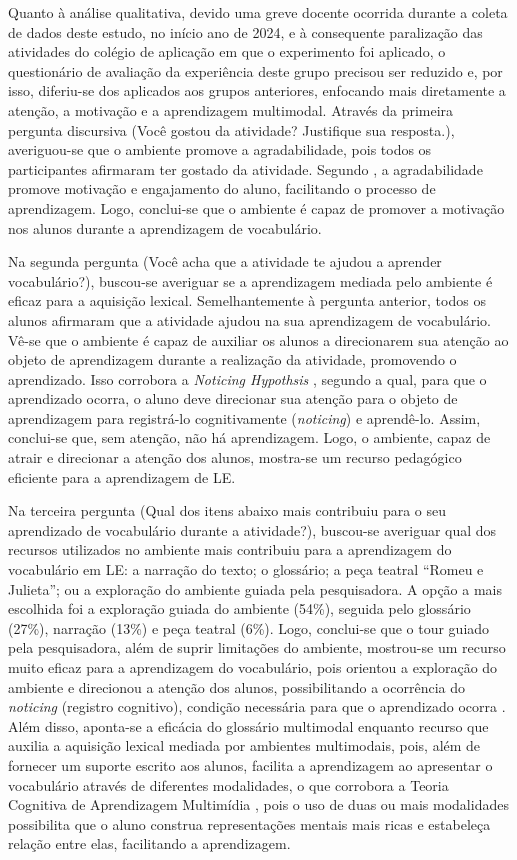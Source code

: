 Quanto à análise qualitativa, devido uma greve docente ocorrida durante
a coleta de dados deste estudo, no início ano de 2024, e à consequente
paralização das atividades do colégio de aplicação em que o experimento
foi aplicado, o questionário de avaliação da experiência deste grupo
precisou ser reduzido e, por isso, diferiu-se dos aplicados aos grupos
anteriores, enfocando mais diretamente a atenção, a motivação e a
aprendizagem multimodal. Através da primeira pergunta discursiva (Você
gostou da atividade? Justifique sua resposta.), averiguou-se que o
ambiente promove a agradabilidade, pois todos os participantes afirmaram
ter gostado da atividade. Segundo \cite{schumann1999neurobiology}, a agradabilidade
promove motivação e engajamento do aluno, facilitando o processo de
aprendizagem. Logo, conclui-se que o ambiente é capaz de promover a
motivação nos alunos durante a aprendizagem de vocabulário.

Na segunda pergunta (Você acha que a atividade te ajudou a aprender
vocabulário?), buscou-se averiguar se a aprendizagem mediada pelo
ambiente é eficaz para a aquisição lexical. Semelhantemente à pergunta
anterior, todos os alunos afirmaram que a atividade ajudou na sua
aprendizagem de vocabulário. Vê-se que o ambiente é capaz de auxiliar os
alunos a direcionarem sua atenção ao objeto de aprendizagem durante a
realização da atividade, promovendo o aprendizado. Isso corrobora a
\emph{Noticing Hypothsis} \cite{schmidit1990}, segundo a qual, para que o
aprendizado ocorra, o aluno deve direcionar sua atenção para o objeto de
aprendizagem para registrá-lo cognitivamente (\emph{noticing}) e
aprendê-lo. Assim, conclui-se que, sem atenção, não há aprendizagem.
Logo, o ambiente, capaz de atrair e direcionar a atenção dos alunos,
mostra-se um recurso pedagógico eficiente para a aprendizagem de LE.

Na terceira pergunta (Qual dos itens abaixo mais contribuiu para o seu
aprendizado de vocabulário durante a atividade?), buscou-se averiguar
qual dos recursos utilizados no ambiente mais contribuiu para a
aprendizagem do vocabulário em LE: a narração do texto; o glossário; a
peça teatral ``Romeu e Julieta''; ou a exploração do ambiente guiada
pela pesquisadora. A opção a mais escolhida foi a exploração guiada do
ambiente (54\%), seguida pelo glossário (27\%), narração (13\%) e peça
teatral (6\%). Logo, conclui-se que o tour guiado pela pesquisadora,
além de suprir limitações do ambiente, mostrou-se um recurso muito
eficaz para a aprendizagem do vocabulário, pois orientou a exploração do
ambiente e direcionou a atenção dos alunos, possibilitando a ocorrência
do \emph{noticing} (registro cognitivo), condição necessária para que o
aprendizado ocorra \cite{schmidit1990}. Além disso, aponta-se a eficácia do
glossário multimodal enquanto recurso que auxilia a aquisição lexical
mediada por ambientes multimodais, pois, além de fornecer um suporte
escrito aos alunos, facilita a aprendizagem ao apresentar o vocabulário
através de diferentes modalidades, o que corrobora a Teoria Cognitiva de
Aprendizagem Multimídia \cite{mayer2001}, pois o uso de duas ou mais
modalidades possibilita que o aluno construa representações mentais mais
ricas e estabeleça relação entre elas, facilitando a aprendizagem.
